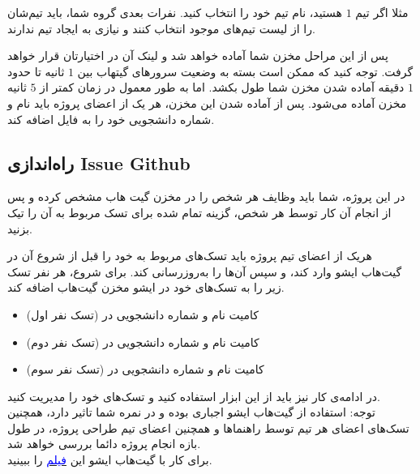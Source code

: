 \documentclass[]{article}
\begin{document}
مثلا اگر تیم $1$ هستید، نام تیم خود را  انتخاب کنید. نفرات بعدی گروه شما، باید تیم‌شان را از لیست تیم‌های موجود انتخاب کنند و نیازی به ایجاد تیم ندارند.

پس از این مراحل مخزن شما آماده خواهد شد و لینک آن در اختیارتان قرار خواهد گرفت. توجه کنید که ممکن است بسته به وضعیت سرورهای گیتهاب بین $1$ ثانیه تا حدود $1$ دقیقه آماده شدن مخزن شما طول بکشد. اما به طور معمول در زمان کمتر از $5$ ثانیه مخزن آماده می‌شود. پس از آماده شدن این مخزن، هر یک از اعضای پروژه باید نام و شماره دانشجویی خود را به فایل  اضافه کند. 

\newpage

\subsection*{{\titr راه‌اندازی Issue Github}}

\label{subsec:GitHub Issue}

در این پروژه، شما باید وظایف هر شخص را در   مخزن گیت هاب مشخص کرده و پس از انجام آن کار توسط هر شخص، گزینه تمام شده برای تسک مربوط به آن را تیک بزنید.

هریک از اعضای تیم پروژه باید تسک‌های مربوط به خود را قبل از شروع آن در گیت‌هاب ایشو وارد کند، و سپس آن‌ها را به‌روزرسانی کند.
برای شروع، هر نفر تسک زیر را به تسک‌های خود در ایشو مخزن گیت‌هاب اضافه کند.
\begin{itemize}

\item
کامیت نام و شماره دانشجویی در  (تسک نفر اول)

\item
کامیت نام و شماره دانشجویی در  (تسک نفر دوم)

\item
کامیت نام و شماره دانشجویی در  (تسک نفر سوم)

\end{itemize}

در ادامه‌ی کار نیز باید از این ابزار استفاده کنید ‌و تسک‌های خود را مدیریت کنید. \\

توجه: استفاده از گیت‌هاب ایشو اجباری بوده و در نمره شما تاثیر دارد، همچنین تسک‌های اعضای هر تیم توسط راهنماها و همچنین اعضای تیم طراحی پروژه، در طول بازه انجام پروژه دائما بررسی خواهد شد.\\

برای کار با گیت‌هاب ایشو این
	\href{https://drive.google.com/file/d/1itbPuW17PJt0KDTaxutk6jHH-l1IEZNO/view?usp=sharing}{\textcolor{blue}{فیلم}} 
را ببینید.
\newpage
\end{document}
